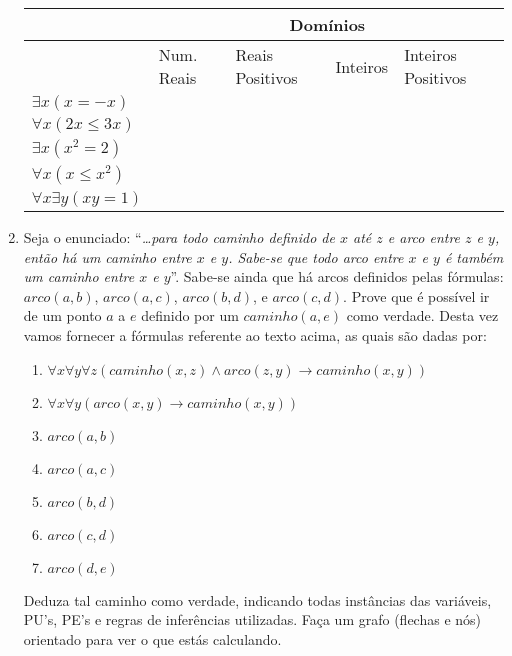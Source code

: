 \documentclass[a4paper,12pt]{article}
\begin{document}
\begin{enumerate}
\begin{center}
\begin{tabular}{l|l|l|l|l} \hline \hline
 & \multicolumn{4}{c}{Domínios} \\ \hline
 & Num. Reais & Reais Positivos & Inteiros & Inteiros Positivos \\ \hline
$\exists x (x = -x)$ & & & & \\ \hline
$\forall x (2x \leq 3x)$ & & & & \\ \hline
$\exists x (x^2 = 2)$ & & & & \\ \hline
$\forall x (x \leq x^2)$ & & & & \\ \hline
$\forall x \exists y (xy = 1)$ & & & & \\ \hline \hline
\end{tabular}
\end{center}


\item Seja o enunciado: ``{\em \ldots para todo caminho definido de $x$ até $z$ e arco entre $z$ e $y$, então há um caminho entre $x$ e $y$. Sabe-se que todo arco 
entre $x$ e $y$ é também um caminho entre $x$ e $y$}''. Sabe-se ainda que há arcos
definidos pelas fórmulas: $arco(a,b)$, $arco(a,c)$, $arco(b,d)$,  e  $arco(c,d)$. 
Prove que é possível ir de um ponto $a$ a $e$ definido por  um 
$caminho(a,e)$ como verdade. Desta vez vamos fornecer
a fórmulas referente ao texto acima, as quais são dadas por:
\begin{enumerate}
\setlength{\itemsep}{-2pt} 
  \item  $\forall x \forall y \forall z ( caminho(x,z) \wedge arco(z,y) \rightarrow  caminho(x,y) )$
\item $\forall x \forall y ( arco(x,y)  \rightarrow  caminho(x,y) )$
\item   $arco(a,b)$
\item   $arco(a,c)$
\item   $arco(b,d)$
\item   $arco(c,d)$
\item   $arco(d,e)$
\end{enumerate}
Deduza tal caminho como verdade, indicando todas instâncias
das variáveis,  PU's, PE's e regras de inferências
utilizadas. Faça um grafo (flechas e nós) orientado para ver o que estás calculando.

\end{enumerate}
\end{document}
